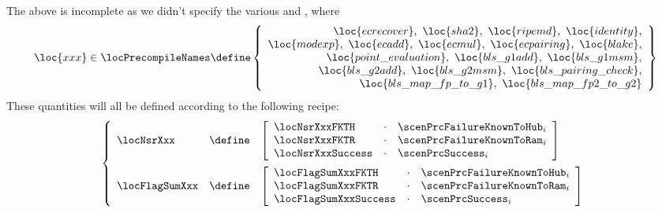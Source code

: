 The above is incomplete as we didn't specify the various
\locFlagSumXxx{} and \locNsrXxx{},
where
\[
	\loc{xxx} \in \locPrecompileNames \define 
	\left\{ \begin{array}{r}
		\loc{ecrecover}, ~
		\loc{sha2}, ~
		\loc{ripemd}, ~
		\loc{identity}, \\
		\loc{modexp}, ~
		\loc{ecadd}, ~
		\loc{ecmul}, ~
		\loc{ecpairing}, ~
		\loc{blake}, \\
		\loc{point\_evaluation}, ~
		\loc{bls\_g1add}, ~
		\loc{bls\_g1msm}, \\
		\loc{bls\_g2add}, ~
		\loc{bls\_g2msm}, ~
		\loc{bls\_pairing\_check}, \\
		\loc{bls\_map\_fp\_to\_g1}, ~
		\loc{bls\_map\_fp2\_to\_g2} \\
	\end{array} \right\}
\]
These quantities will all be defined according to the following recipe:
\[
	\left\{ \begin{array}{lcl}
		\locNsrXxx       & \define & 
		\left[ \begin{array}{lcl}
			\locNsrXxxFKTH    & \cdot & \scenPrcFailureKnownToHub _{i} \\
			\locNsrXxxFKTR    & \cdot & \scenPrcFailureKnownToRam _{i} \\
			\locNsrXxxSuccess & \cdot & \scenPrcSuccess           _{i} \\
		\end{array} \right]
		\vspace{2mm} \\
		\locFlagSumXxx   & \define &
		\left[ \begin{array}{lcl}
			\locFlagSumXxxFKTH    & \cdot & \scenPrcFailureKnownToHub _{i} \\
			\locFlagSumXxxFKTR    & \cdot & \scenPrcFailureKnownToRam _{i} \\
			\locFlagSumXxxSuccess & \cdot & \scenPrcSuccess           _{i} \\
		\end{array} \right]
		\\
	\end{array} \right.
\]
